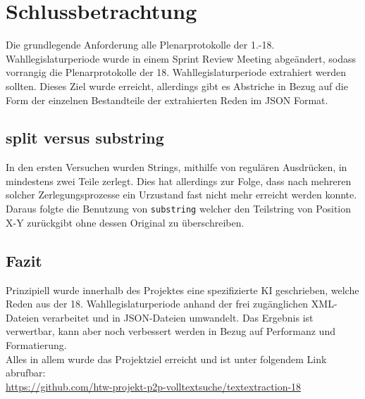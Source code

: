 \chapter{Schlussbetrachtung}
Die grundlegende Anforderung alle Plenarprotokolle der 1.-18. Wahllegislaturperiode wurde in einem Sprint Review Meeting abgeändert, sodass vorrangig die Plenarprotokolle der 18. Wahllegislaturperiode extrahiert werden sollten.
Dieses Ziel wurde erreicht, allerdings gibt es Abstriche in Bezug auf die Form der einzelnen Bestandteile der extrahierten Reden im JSON Format.\\

\section{split versus substring}
In den ersten Versuchen wurden Strings, mithilfe von regulären Ausdrücken, in mindestens zwei Teile zerlegt. Dies hat allerdings zur Folge, dass nach mehreren solcher Zerlegungsprozesse ein Urzustand fast nicht mehr erreicht werden konnte. Daraus folgte die Benutzung von \lstinline|substring| welcher den Teilstring von Position X-Y zurückgibt ohne dessen Original zu überschreiben.

\section{Fazit}
Prinzipiell wurde innerhalb des Projektes eine spezifizierte KI geschrieben, welche Reden aus der 18. Wahllegislaturperiode anhand der frei zugänglichen XML-Dateien\cite{protokolle} verarbeitet und in JSON-Dateien umwandelt. Das Ergebnis ist verwertbar, kann aber noch verbessert werden in Bezug auf Performanz und Formatierung.\\
Alles in allem wurde das Projektziel erreicht und ist unter folgendem Link abrufbar:\\ \url{https://github.com/htw-projekt-p2p-volltextsuche/textextraction-18}